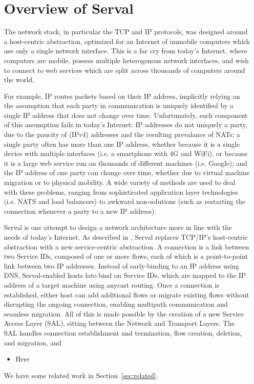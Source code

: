 \section{Overview of Serval}
\label{sec:serval}

The network stack, in particular the TCP and IP protocols, was designed around a host-centric abstraction, optimized for an Internet of immobile computers which use only a single network interface. This is a far cry from today's Internet, where computers are mobile, possess multiple heterogenous network interfaces, and wish to connect to web services which are split across thousands of computers around the world. 

For example, IP routes packets based on their IP address, implicitly relying on the assumption that each party in communication is uniquely identified by a single IP address that does not change over time. Unfortunately, each component of this assumption fails in today's Internet: IP addresses do not uniquely a party, due to the paucity of (IPv4) addresses and the resulting prevalance of NATs; a single party often has more than one IP address, whether because it is a single device with multiple interfaces (i.e. a smartphone with 4G and WiFi), or because it is a large web service run on thousands of different machines (i.e. Google); and the IP address of one party can change over time, whether due to virtual machine migration or to physical mobility. A wide variety of methods are used to deal with these problems, ranging from sophisticated application layer technologies (i.e. NATS and load balancers) to awkward non-solutions (such as restarting the connection whenever a party to a new IP address).

Serval is one attempt to design a network architecture more in line with the needs of today's Internet. As described in \cite{nordstrom2012serval}, Serval replaces TCP/IP's host-centric abstraction with a new service-centric abstraction. A connection is a link between two Service IDs, composed of one or more flows, each of which is a point-to-point link between two IP addresses. Instead of early-binding to an IP address using DNS, Serval-enabled hosts late-bind on Service IDs, which are mapped to the IP address of a target machine using anycast routing. Once a connection is established, either host can add additional flows or migrate existing flows without disrupting the ongoing connection, enabling multipath communication and seamless migration. All of this is made possible by the creation of a new Service Access Layer (SAL), sitting between the Network and Transport Layers. The SAL handles connection establishment and termination, flow creation, deletion, and migration, and 





\begin{itemize}
  \item Here
\end{itemize}

We have some related work in Section~\ref{sec:related}.